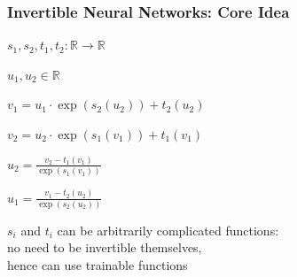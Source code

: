 \documentclass[aspectratio=43]{beamer}
\begin{document}
\begin{frame}
	\frametitle{Invertible Neural Networks: Core Idea}
			\begin{description}
			\item<1->$s_1, s_2, t_1, t_2: \mathbb{R} \rightarrow \mathbb{R} $
			\item<1->$u_1, u_2 \in \mathbb{R}$
			\item<2->$v_1 = u_1 \cdot \exp(s_2(u_2)) + t_2(u_2)$
			\item<2->$v_2 = u_2 \cdot \exp(s_1(v_1)) + t_1(v_1)$
			\item<3->$u_2 = \frac{v_2 - t_1(v_1)}{\exp(s_1(v_1))}$
			\item<3->$u_1 = \frac{v_1 - t_2(u_2)}{\exp(s_2(u_2))}$
			\item 
			\item<4>\alert{$s_i$ and $t_i$ can be arbitrarily complicated functions:\\
			no need to be invertible themselves,\\ hence can use trainable functions}
			\end{description}
\end{frame}
\end{document}
